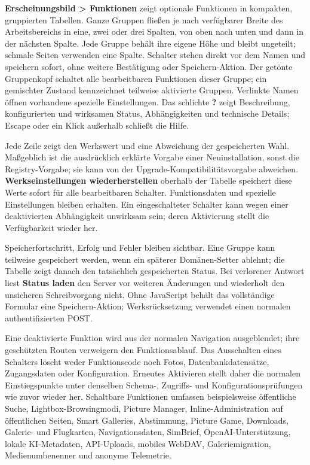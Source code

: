 \documentclass[11pt,a4paper]{article}
\newcommand{\ui}[1]{\textbf{#1}}
\begin{document}
\ui{Erscheinungsbild > Funktionen} zeigt optionale Funktionen in kompakten,
gruppierten Tabellen. Ganze Gruppen fließen je nach verfügbarer Breite des
Arbeitsbereichs in eine, zwei oder drei Spalten, von oben nach unten und dann
in der nächsten Spalte. Jede Gruppe behält ihre eigene Höhe und bleibt
ungeteilt; schmale Seiten verwenden eine Spalte.
Schalter stehen direkt vor dem Namen und speichern sofort,
ohne weitere Bestätigung oder Speichern-Aktion. Der getönte Gruppenkopf schaltet
alle bearbeitbaren Funktionen dieser Gruppe; ein gemischter Zustand kennzeichnet
teilweise aktivierte Gruppen. Verlinkte Namen öffnen vorhandene spezielle
Einstellungen. Das schlichte \ui{?} zeigt Beschreibung, konfigurierten und
wirksamen Status, Abhängigkeiten und technische Details; Escape oder ein Klick
außerhalb schließt die Hilfe.

Jede Zeile zeigt den Werkswert und eine Abweichung der gespeicherten Wahl.
Maßgeblich ist die ausdrücklich erklärte Vorgabe einer Neuinstallation, sonst
die Registry-Vorgabe; sie kann von der Upgrade-Kompatibilitätsvorgabe abweichen.
\ui{Werkseinstellungen wiederherstellen} oberhalb der Tabelle speichert diese
Werte sofort für alle bearbeitbaren Schalter. Funktionsdaten und spezielle
Einstellungen bleiben erhalten. Ein eingeschalteter Schalter kann wegen einer
deaktivierten Abhängigkeit unwirksam sein; deren Aktivierung stellt die
Verfügbarkeit wieder her.

Speicherfortschritt, Erfolg und Fehler bleiben sichtbar. Eine Gruppe kann
teilweise gespeichert werden, wenn ein späterer Domänen-Setter ablehnt; die
Tabelle zeigt danach den tatsächlich gespeicherten Status. Bei verlorener
Antwort liest \ui{Status laden} den Server vor weiteren Änderungen und
wiederholt den unsicheren Schreibvorgang nicht. Ohne JavaScript behält das
vollständige Formular eine Speichern-Aktion; Werksrücksetzung verwendet einen
normalen authentifizierten POST.

Eine deaktivierte Funktion wird aus der normalen Navigation ausgeblendet; ihre
geschützten Routen verweigern den Funktionsablauf. Das Ausschalten eines
Schalters löscht weder Funktionscode noch Fotos, Datenbankdatensätze,
Zugangsdaten oder Konfiguration. Erneutes Aktivieren stellt daher die normalen
Einstiegspunkte unter denselben Schema-, Zugriffs- und Konfigurationsprüfungen
wie zuvor wieder her. Schaltbare Funktionen umfassen beispielsweise öffentliche
Suche, Lightbox-Browsingmodi, Picture Manager, Inline-Administration auf
öffentlichen Seiten, Smart Galleries, Abstimmung, Picture Game, Downloads,
Galerie- und Flugkarten, Navigationsdaten, SimBrief, OpenAI-Unterstützung,
lokale KI-Metadaten, API-Uploads, mobiles WebDAV, Galeriemigration,
Medienumbenenner und anonyme Telemetrie.
\end{document}
